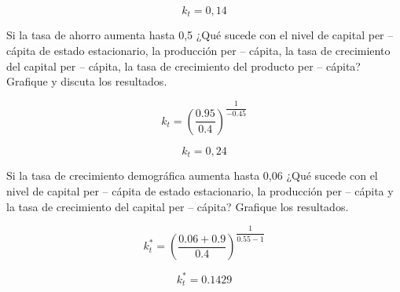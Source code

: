\documentclass{oxmathproblems}
\begin{document}
\begin{questions}
\begin{parts}
\begin{subparts}
    $$k_t=0,14$$

    \subpart Si la tasa de ahorro aumenta hasta 0,5 ¿Qué sucede con el nivel de capital per – cápita de estado estacionario, la producción per – cápita, la tasa de crecimiento del capital per – cápita, la tasa de crecimiento del producto per – cápita? Grafique y discuta los resultados.
    
    $$k_t=(\dfrac{0.95}{0.4})^{\dfrac{1}{-0.45 }}$$
    
    $$k_t=0,24$$
    
    \subpart Si la tasa de crecimiento demográfica aumenta hasta 0,06 ¿Qué sucede con el nivel de capital per – cápita de estado estacionario, la producción per – cápita y la tasa de crecimiento del capital per – cápita? Grafique los resultados.
    
    $$k_t^*=(\dfrac{0.06+0.9}{0.4})^{\dfrac{1}{0.55 - 1}}$$
    
    $$k_t^*=0.1429$$
    
    

\end{subparts}
\end{parts}
\end{questions}
\end{document}

